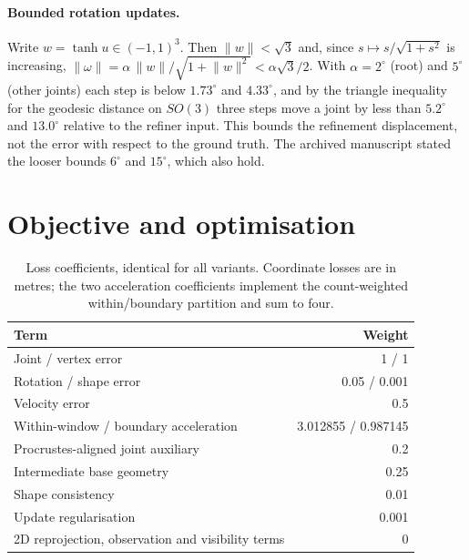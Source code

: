 \documentclass[10pt,onecolumn,letterpaper]{article}
\begin{document}
\paragraph{Bounded rotation updates.}
Write $w=\tanh u\in(-1,1)^3$. Then $\lVert w\rVert<\sqrt3$ and, since $s\mapsto s/\sqrt{1+s^2}$ is increasing, $\lVert\omega\rVert=\alpha\,\lVert w\rVert/\sqrt{1+\lVert w\rVert^2}<\alpha\sqrt3/2$.
With $\alpha=2^\circ$ (root) and $5^\circ$ (other joints) each step is below $1.73^\circ$ and $4.33^\circ$, and by the triangle inequality for the geodesic distance on $SO(3)$ three steps move a joint by less than $5.2^\circ$ and $13.0^\circ$ relative to the refiner input.
This bounds the refinement displacement, not the error with respect to the ground truth.
The archived manuscript stated the looser bounds $6^\circ$ and $15^\circ$, which also hold.

\section{Objective and optimisation}
\label{sec:optim}

\begin{table}[h]
  \centering\small
  \begin{tabular}{@{}l r@{}}
    \toprule
    Term & Weight \\
    \midrule
    Joint / vertex error & 1 / 1 \\
    Rotation / shape error & 0.05 / 0.001 \\
    Velocity error & 0.5 \\
    Within-window / boundary acceleration & 3.012855 / 0.987145 \\
    Procrustes-aligned joint auxiliary & 0.2 \\
    Intermediate base geometry & 0.25 \\
    Shape consistency & 0.01 \\
    Update regularisation & 0.001 \\
    2D reprojection, observation and visibility terms & 0 \\
    \bottomrule
  \end{tabular}
  \caption{Loss coefficients, identical for all variants. Coordinate losses are in metres; the two acceleration coefficients implement the count-weighted within/boundary partition and sum to four.}
  \label{tab:loss}
\end{table}
\end{document}
